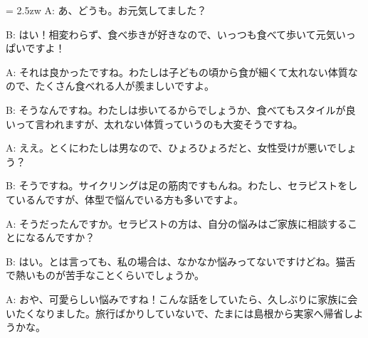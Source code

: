 \documentclass[11pt]{amsart}
\title{}
\author{}
\newenvironment{hangall}[1]{\hangindent = 2.5zw\everypar{\hangindent = 2.5zw}}{}
\begin{document}
\maketitle
\begin{hangall}{}%
A: あ、どうも。お元気してました？



B: はい！相変わらず、食べ歩きが好きなので、いっつも食べて歩いて元気いっぱいですよ！



A: それは良かったですね。わたしは子どもの頃から食が細くて太れない体質なので、たくさん食べれる人が羨ましいですよ。



B: そうなんですね。わたしは歩いてるからでしょうか、食べてもスタイルが良いって言われますが、太れない体質っていうのも大変そうですね。



A: ええ。とくにわたしは男なので、ひょろひょろだと、女性受けが悪いでしょう？



B: そうですね。サイクリングは足の筋肉ですもんね。わたし、セラピストをしているんですが、体型で悩んでいる方も多いですよ。



A: そうだったんですか。セラピストの方は、自分の悩みはご家族に相談することになるんですか？



B: はい。とは言っても、私の場合は、なかなか悩みってないですけどね。猫舌で熱いものが苦手なことくらいでしょうか。



A: おや、可愛らしい悩みですね！こんな話をしていたら、久しぶりに家族に会いたくなりました。旅行ばかりしていないで、たまには島根から実家へ帰省しようかな。\end{hangall}
\end{document}

